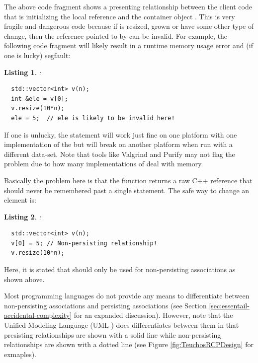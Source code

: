 \documentclass[pdf,ps2pdf,11pt]{SANDreport}
\newtheorem{listing}{Listing}
\begin{document}
The above code fragment shows a presenting relationship between the
client code that is initializing the local reference {} and
the {} container object {}.  This is very
fragile and dangerous code because if {} is resized, grown or
have some other type of change, then the reference pointed to by
{} can be invalid.  For example, the following code fragment
will likely result in a runtime memory usage error and (if one is
lucky) segfault:

\begin{listing}:\\
{\small\begin{verbatim}
  std::vector<int> v(n);
  int &ele = v[0];
  v.resize(10*n);
  ele = 5;  // ele is likely to be invalid here!
\end{verbatim}}
\end{listing}

If one is unlucky, the statement {} will work just fine
on one platform with one implementation of the {} but
will break on another platform when run with a different data-set.
Note that tools like Valgrind and Purify may not flag the problem due
to how many implementations of {} deal with memory.

Basically the problem here is that the
{} function returns a raw
C++ reference that should never be remembered past a single statement.
The safe way to change an element is:

\begin{listing}:\\
{\small\begin{verbatim}
  std::vector<int> v(n);
  v[0] = 5; // Non-persisting relationship!
  v.resize(10*n);
\end{verbatim}}
\end{listing}

Here, it is stated that {}
should only be used for non-persisting associations as shown above.

Most programming languages do not provide any means to differentiate
between non-persisting associations and persisting associations (see
Section {}\ref{sec:essentail-accidental-complexity} for an expanded
discussion).  However, note that the Unified Modeling Language (UML
{}\cite{UMLDistilledThirdEdition04}) does differentiates between them
in that presisting relationships are shown with a solid line while
non-persisting relationships are shown with a dotted line (see Figure
{}\ref{fig:TeuchosRCPDesign} for exmaples).
\end{document}
